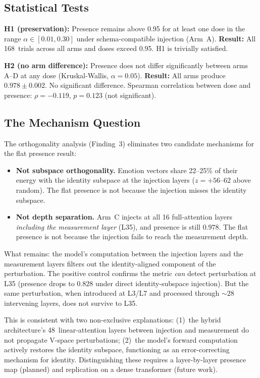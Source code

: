 \documentclass[11pt,a4paper]{article}
\begin{document}
\subsection{Statistical Tests}

\textbf{H1 (preservation):} Presence remains above 0.95 for at least one
dose in the range $\alpha \in [0.01, 0.30]$ under schema-compatible
injection (Arm~A). \textbf{Result:} All 168~trials across all arms and
doses exceed 0.95. H1 is trivially satisfied.

\textbf{H2 (no arm difference):} Presence does not differ significantly
between arms A--D at any dose (Kruskal-Wallis, $\alpha = 0.05$).
\textbf{Result:} All arms produce $0.978 \pm 0.002$. No significant
difference. Spearman correlation between dose and presence:
$\rho{=}{-}0.119$, $p{=}0.123$ (not significant).

\subsection{The Mechanism Question}

The orthogonality analysis (Finding~3) eliminates two candidate mechanisms
for the flat presence result:

\begin{itemize}[nosep]
  \item \textbf{Not subspace orthogonality.} Emotion vectors share
    22--25\% of their energy with the identity subspace at the injection
    layers ($z{=}{+}56$--$62$ above random). The flat presence is not
    because the injection misses the identity subspace.
  \item \textbf{Not depth separation.} Arm~C injects at all 16
    full-attention layers \emph{including the measurement layer} (L35),
    and presence is still $0.978$. The flat presence is not because the
    injection fails to reach the measurement depth.
\end{itemize}

What remains: the model's computation between the injection layers and
the measurement layers filters out the identity-aligned component of the
perturbation. The positive control confirms the metric \emph{can} detect
perturbation at L35 (presence drops to $0.828$ under direct
identity-subspace injection). But the same perturbation, when introduced
at L3/L7 and processed through $\sim$28 intervening layers, does not
survive to L35.

This is consistent with two non-exclusive explanations: (1)~the hybrid
architecture's 48~linear-attention layers between injection and measurement
do not propagate V-space perturbations; (2)~the model's forward computation
actively restores the identity subspace, functioning as an error-correcting
mechanism for identity. Distinguishing these requires a layer-by-layer
presence map (planned) and replication on a dense transformer (future work).
\end{document}
